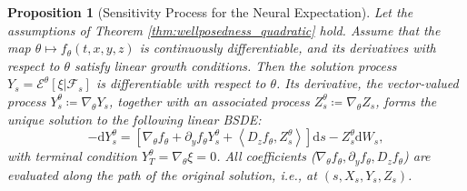 \documentclass[qian]{imsart}
\newcommand{\Fcal}{\mathcal{F}}
\newcommand{\cEneutheta}{\mathcal{E}^{\theta}}
\newcommand{\dd}{\mathrm{d}}
\newcommand{\scpr}[2]{\left\langle #1, #2 \right\rangle}
\theoremstyle{plain}
\newtheorem{proposition}[theorem]{Proposition}
\theoremstyle{definition}
\begin{document}
\begin{proposition}[Sensitivity Process for the Neural Expectation]
\label{prop:sensitivity_bsde}
Let the assumptions of Theorem \ref{thm:wellposedness_quadratic} hold. Assume that the map $\theta \mapsto f_\theta(t,x,y,z)$ is continuously differentiable, and its derivatives with respect to $\theta$ satisfy linear growth conditions. Then the solution process $Y_s = \cEneutheta[\xi|\Fcal_s]$ is differentiable with respect to $\theta$. Its derivative, the vector-valued process $Y^\theta_s \coloneqq \nabla_\theta Y_s$, together with an associated process $Z^\theta_s \coloneqq \nabla_\theta Z_s$, forms the unique solution to the following linear BSDE:
\begin{equation}
\label{eq:differentiated_bsde}
- \dd Y^\theta_s = \left[ \nabla_\theta f_\theta + \partial_y f_\theta Y^\theta_s + \scpr{D_z f_\theta}{Z^\theta_s} \right] \dd s - Z^\theta_s \dd W_s,
\end{equation}
with terminal condition $Y^\theta_T = \nabla_\theta \xi = 0$. All coefficients ($\nabla_\theta f_\theta, \partial_y f_\theta, D_z f_\theta$) are evaluated along the path of the original solution, i.e., at $(s, X_s, Y_s, Z_s)$.
\end{proposition}
\end{document}
